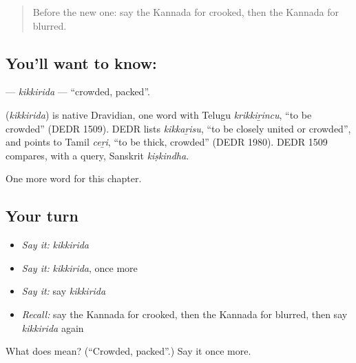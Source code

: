 \label{lesson:KA-C256-kikkirida}



\begin{quote}
Before the new one: say the Kannada for crooked, then the Kannada for blurred.
\end{quote}

\subsection*{You'll want to know: }
\textbf{} — \emph{kikkirida} — \textquotedblleft{}crowded, packed\textquotedblright{}.

\begin{cousinweb}
\textbf{} (\emph{kikkirida}) is native Dravidian, one word with Telugu \emph{krikkiṟincu}, \textquotedblleft{}to be crowded\textquotedblright{} (DEDR 1509). DEDR lists \emph{kikkaṟisu}, \textquotedblleft{}to be closely united or crowded\textquotedblright{}, and points to Tamil \emph{ceṟi}, \textquotedblleft{}to be thick, crowded\textquotedblright{} (DEDR 1980). DEDR 1509 compares, with a query, Sanskrit \emph{kiṣkindha}.
\end{cousinweb}

\begin{grammarlens}[title={What you've built}]
One more word for this chapter.
\end{grammarlens}

\subsection*{Your turn}
\begin{itemize}
\raggedright
  \item \emph{Say it:} \emph{kikkirida}
  \item \emph{Say it:} \emph{kikkirida}, once more
  \item \emph{Say it:} say \emph{kikkirida}
  \item \emph{Recall:} say the Kannada for crooked, then the Kannada for blurred, then say \emph{kikkirida} again
\end{itemize}

\begin{tcolorbox}[breakable,colback=teal!4,colframe=teal!35!black,title={Before you move on}]
What does  mean? (\textquotedblleft{}Crowded, packed\textquotedblright{}.) Say it once more.
\end{tcolorbox}
